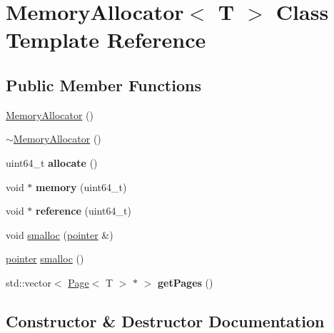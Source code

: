 \hypertarget{class_memory_allocator}{}\section{Memory\+Allocator$<$ T $>$ Class Template Reference}
\label{class_memory_allocator}
\subsection*{Public Member Functions}
\begin{DoxyCompactItemize}
\item 
\hyperlink{class_memory_allocator_a9c7ca60e8881012d0311c98689359c91}{Memory\+Allocator} ()
\item 
\hyperlink{class_memory_allocator_a06ba8aa77baa4fea0096da7f0c720e7b}{$\sim$\+Memory\+Allocator} ()
\item 
\mbox{\label{class_memory_allocator_a3666385085a0766287a7406f192ad2d3}} 
uint64\+\_\+t {\bfseries allocate} ()
\item 
\mbox{\label{class_memory_allocator_a349594e91676987dd38c49d8e9ed60fc}} 
void $\ast$ {\bfseries memory} (uint64\+\_\+t)
\item 
\mbox{\label{class_memory_allocator_a0e68bf95dfe75d4db24fb765cfa7c0fb}} 
void $\ast$ {\bfseries reference} (uint64\+\_\+t)
\item 
void \hyperlink{class_memory_allocator_a0afd80ad46c6631bc7986d8a3fe36f3c}{smalloc} (\hyperlink{structpointer}{pointer} \&)
\item 
\hyperlink{structpointer}{pointer} \hyperlink{class_memory_allocator_a8712abdd481153bf70734258bfc3f8b9}{smalloc} ()
\item 
\mbox{\label{class_memory_allocator_a528a642157870b5d8e667a0cf4fcebfd}} 
std\+::vector$<$ \hyperlink{class_page}{Page}$<$ T $>$ $\ast$ $>$ {\bfseries get\+Pages} ()
\end{DoxyCompactItemize}


\subsection{Constructor \& Destructor Documentation}
\mbox{\label{class_memory_allocator_a9c7ca60e8881012d0311c98689359c91}} 

